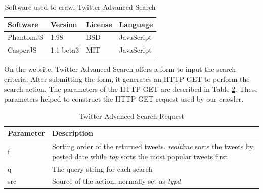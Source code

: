 \begin{table}[htb!]
\caption{Software used to crawl Twitter Advanced Search}
\label{table:crawlerSoftware}
\centering
\begin{tabular}{|l|l|l|l|}

\hline
\textbf{Software} & \textbf{Version} & \textbf{License} & \textbf{Language} \\ \hline \hline
PhantomJS & 1.98 & BSD & JavaScript \\ \hline
CasperJS & 1.1-beta3 & MIT & JavaScript \\ \hline

\end{tabular}
\end{table}

On the website, Twitter Advanced Search offers a form to input the search criteria. After submitting the form, it generates an HTTP GET to perform the search action. The parameters of the HTTP GET are described in Table \ref{table:crawlerRequest}. These parameters helped to construct the HTTP GET request used by our crawler.

\begin{table}[htb!]
\caption{Twitter Advanced Search Request}
\label{table:crawlerRequest}
\centering
\begin{tabular}{|p{2cm}|p{10cm}|}

\hline
\textbf{Parameter} & \textbf{Description} \\ \hline \hline
f & Sorting order of the returned tweets. \textit{realtime} sorts the tweets by posted date while \textit{top} sorts the most popular tweets first \\ \hline
q & The query string for each search \\ \hline
src & Source of the action, normally set as \textit{typd} \\ \hline
\end{tabular}
\end{table}

